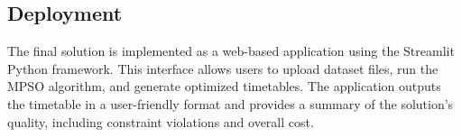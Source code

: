 \subsection{Deployment}
\label{subsec:deployment}
The final solution is implemented as a web-based application using the Streamlit Python framework. This interface allows users to upload dataset files, run the MPSO algorithm, and generate optimized timetables. The application outputs the timetable in a user-friendly format and provides a summary of the solution's quality, including constraint violations and overall cost.
